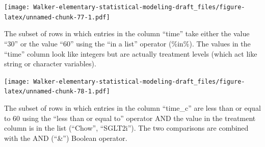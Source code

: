 \documentclass[]{book}
\newenvironment{Shaded}{\begin{snugshade}}{\end{snugshade}}
\newcommand{\DataTypeTok}[1]{\textcolor[rgb]{0.13,0.29,0.53}{#1}}
\newcommand{\DecValTok}[1]{\textcolor[rgb]{0.00,0.00,0.81}{#1}}
\newcommand{\ErrorTok}[1]{\textcolor[rgb]{0.64,0.00,0.00}{\textbf{#1}}}
\newcommand{\KeywordTok}[1]{\textcolor[rgb]{0.13,0.29,0.53}{\textbf{#1}}}
\newcommand{\NormalTok}[1]{#1}
\newcommand{\OperatorTok}[1]{\textcolor[rgb]{0.81,0.36,0.00}{\textbf{#1}}}
\newcommand{\StringTok}[1]{\textcolor[rgb]{0.31,0.60,0.02}{#1}}
\begin{document}
\texttt{[image: Walker-elementary-statistical-modeling-draft\_files/figure-latex/unnamed-chunk-77-1.pdf]}

The subset of rows in which entries in the column ``time'' take either the value ``30'' or the value ``60'' using the ``in a list'' operator (\%in\%). The values in the ``time'' column look like integers but are actually treatment levels (which act like string or character variables).

\begin{Shaded}
\end{Shaded}

\texttt{[image: Walker-elementary-statistical-modeling-draft\_files/figure-latex/unnamed-chunk-78-1.pdf]}

The subset of rows in which entries in the column ``time\_c'' are less than or equal to 60 using the ``less than or equal to'' operator AND the value in the treatment column is in the list (``Chow'', ``SGLT2i''). The two comparisons are combined with the AND (``\&'') Boolean operator.

\begin{Shaded}
\end{Shaded}
\end{document}
